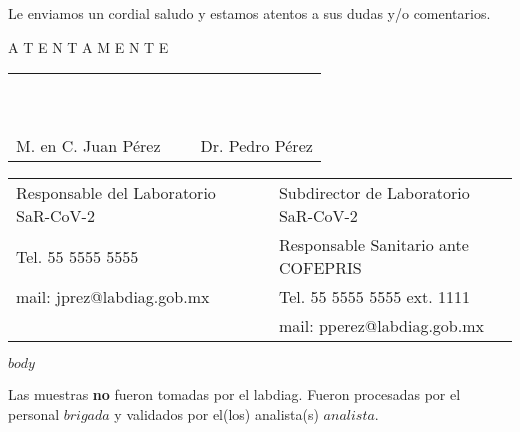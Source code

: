 \documentclass{article}
\begin{document}
\smallskip

Le enviamos un cordial saludo y estamos atentos a sus dudas y/o comentarios.\\

\medskip

\vspace*{\fill}
\begin{center}
A T E N T A M E N T E
\end{center}

\vspace{2cm}
\begin{center}
\begin{tabular}{m{8cm} p{1cm} m{8cm}}
~ & ~ & ~ \\
~ & ~ & ~ \\
\cmidrule(r){1-1}\cmidrule(l){3-3}
M. en C. Juan Pérez & ~ & Dr. Pedro Pérez \\
\end{tabular}

\footnotesize
\begin{tabular}{m{8cm} p{1cm} m{8cm}}
Responsable del Laboratorio SaR-CoV-2 & ~ & Subdirector de Laboratorio SaR-CoV-2\\
Tel. 55 5555 5555 & ~ & Responsable Sanitario ante COFEPRIS\\
mail: jprez@labdiag.gob.mx & ~ & Tel. 55 5555 5555 ext. 1111\\
~ & ~ & mail: pperez@labdiag.gob.mx \\
\end{tabular}
\end{center}

\clearpage

$body$


\vspace*{\fill}
{\footnotesize Las muestras \textbf{no} fueron tomadas por el labdiag. Fueron procesadas por el personal $brigada$ y validados por el(los) analista(s) $analista$. \par}
\end{document}
